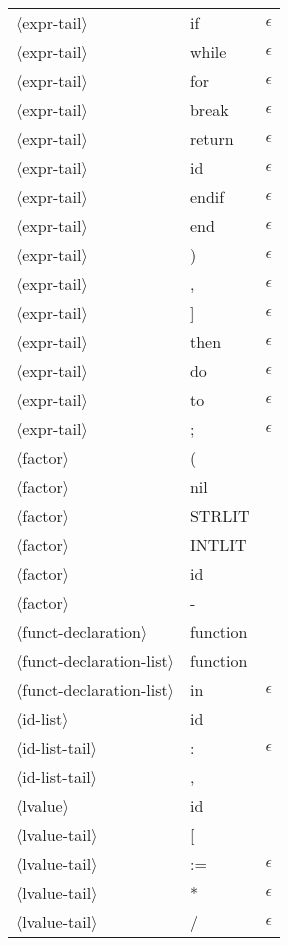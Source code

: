 \documentclass[11pt, fleqn]{article}
\newcommand{\atag}[1]{$\langle$#1$\rangle$}
\begin{document}
\begin{longtable}{l|l|l}
\atag{expr-tail}					&	if		&		$\epsilon$	\\
\atag{expr-tail}					&	while		&	$\epsilon$		\\
\atag{expr-tail}					&	for		&	$\epsilon$		\\
\atag{expr-tail}					&	break		&	$\epsilon$		\\
\atag{expr-tail}					&	return		&	$\epsilon$		\\
\atag{expr-tail}					&	id		&		$\epsilon$	\\
\atag{expr-tail}					&	endif		&	$\epsilon$		\\
\atag{expr-tail}					&	end		&	$\epsilon$		\\
\atag{expr-tail}					&	)		&	$\epsilon$		\\
\atag{expr-tail}					&	,		&	$\epsilon$		\\
\atag{expr-tail}					&	]		&	$\epsilon$		\\
\atag{expr-tail}					&	then		&	$\epsilon$		\\
\atag{expr-tail}					&	do		&	$\epsilon$		\\
\atag{expr-tail}					&	to		&	$\epsilon$		\\
\atag{expr-tail}					&	;		&	$\epsilon$		\\
\atag{factor}					&	(		&			\\
\atag{factor}					&	nil		&			\\
\atag{factor}					&	STRLIT	&			\\
\atag{factor}					&	INTLIT	&			\\
\atag{factor}					&	id		&			\\
\atag{factor}					&	-		&			\\
\atag{funct-declaration}			&	function		&		\\
\atag{funct-declaration-list}	&	function		&		\\
\atag{funct-declaration-list}	&	in		&	$\epsilon$	\\
\atag{id-list}					&	id		&		\\
\atag{id-list-tail}				&	:		&	$\epsilon$	\\
\atag{id-list-tail}				&	,		&		\\
\atag{lvalue}					&	id		&				\\
\atag{lvalue-tail}				&	[		&												\\
\atag{lvalue-tail}				&	:=		&	$\epsilon$											\\
\atag{lvalue-tail}				&	*		&	$\epsilon$											\\
\atag{lvalue-tail}				&	/		&	$\epsilon$											\\

\end{longtable}
\end{document}
